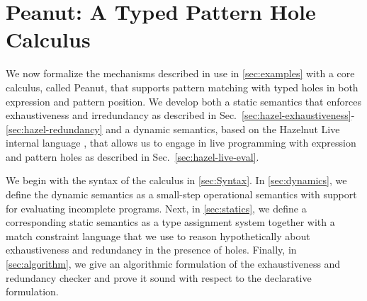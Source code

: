 \section{Peanut: A Typed Pattern Hole Calculus}
We now formalize the mechanisms described in use in \autoref{sec:examples} with a core calculus, called Peanut, that supports pattern matching with typed holes in both expression and pattern position. We develop both a static semantics that enforces exhaustiveness and irredundancy as described in Sec.~\ref{sec:hazel-exhaustiveness}-\ref{sec:hazel-redundancy} and a dynamic semantics, based on the Hazelnut Live internal language \cite{DBLP:journals/pacmpl/OmarVCH19}, that allows us to engage in live programming with expression and pattern holes as described in Sec.~\ref{sec:hazel-live-eval}.


We begin with the syntax of the calculus in \autoref{sec:Syntax}.
In \autoref{sec:dynamics}, we define the dynamic semantics as a small-step operational semantics with support for evaluating incomplete programs.
Next, in \autoref{sec:statics}, we define a corresponding static semantics as a type assignment system together with a match constraint language that we use to reason hypothetically about exhaustiveness and redundancy in the presence of
holes.
Finally, in \autoref{sec:algorithm}, we give an algorithmic formulation of the exhaustiveness and redundancy checker and prove it sound with respect to the declarative formulation.




